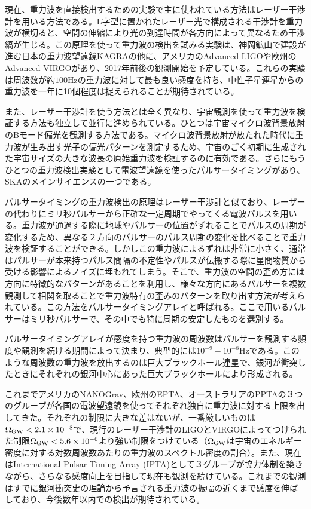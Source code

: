 現在、重力波を直接検出するための実験で主に使われている方法はレーザー干渉計を用いる方法である。L字型に置かれたレーザー光で構成される干渉計を重力波が横切ると、空間の伸縮により光の到達時間が各方向によって異なるため干渉縞が生じる。この原理を使って重力波の検出を試みる実験は、神岡鉱山で建設が進む日本の重力波望遠鏡KAGRAの他に、アメリカのAdvanced-LIGOや欧州のAdvanced-VIRGOがあり、2017年前後の観測開始を予定している。これらの実験は周波数が約$100$Hzの重力波に対して最も良い感度を持ち、中性子星連星からの重力波を一年に10個程度は捉えられることが期待されている。

また、レーザー干渉計を使う方法とは全く異なり、宇宙観測を使って重力波を検証する方法も独立して並行に進められている。ひとつは宇宙マイクロ波背景放射のBモード偏光を観測する方法である。マイクロ波背景放射が放たれた時代に重力波が生み出す光子の偏光パターンを測定するため、宇宙のごく初期に生成された宇宙サイズの大きな波長の原始重力波を検証するのに有効である。さらにもうひとつの重力波検出実験として電波望遠鏡を使ったパルサータイミングがあり、SKAのメインサイエンスの一つである。

パルサータイミングの重力波検出の原理はレーザー干渉計と似ており、レーザーの代わりにミリ秒パルサーから正確な一定周期でやってくる電波パルスを用いる。重力波が通過する際に地球やパルサーの位置がずれることでパルスの周期が変化するため、異なる２方向のパルサーのパルス周期の変化を比べることで重力波を検証することができる。しかしこの重力波によるずれは非常に小さく、通常はパルサーが本来持つパルス間隔の不定性やパルスが伝搬する際に星間物質から受ける影響によるノイズに埋もれてしまう。そこで、重力波の空間の歪め方には方向に特徴的なパターンがあることを利用し、様々な方向にあるパルサーを複数観測して相関を取ることで重力波特有の歪みのパターンを取り出す方法が考えられている。この方法をパルサータイミングアレイと呼ばれる。ここで用いるパルサーはミリ秒パルサーで、その中でも特に周期の安定したものを選別する。

パルサータイミングアレイが感度を持つ重力波の周波数はパルサーを観測する頻度や観測を続ける期間によって決まり、典型的には$10^{-9}-10^{-8}$Hzである。このような周波数の重力波を放出するのは巨大ブラックホール連星で、銀河が衝突したときにそれぞれの銀河中心にあった巨大ブラックホールにより形成される。

これまでアメリカのNANOGrav、欧州のEPTA、オーストラリアのPPTAの３つのグループが各国の電波望遠鏡を使ってそれぞれ独自に重力波に対する上限を出してきた。それぞれの制限に大きな差はないが、一番厳しいものは$\Omega_{\rm GW}< 2.1\times 10^{-8}$で、現行のレーザー干渉計のLIGOとVIRGOによってつけられた制限$\Omega_{\rm GW}< 5.6\times 10^{-6}$より強い制限をつけている（$\Omega_{\rm GW}$は宇宙のエネルギー密度に対する対数周波数あたりの重力波のスペクトル密度の割合）。また、現在はInternational Pulsar Timing Array (IPTA)として３グループが協力体制を築きながら、さらなる感度向上を目指して現在も観測を続けている。これまでの観測はすでに銀河衝突史の理論から予言される重力波の振幅の近くまで感度を伸ばしており、今後数年以内での検出が期待されている。

